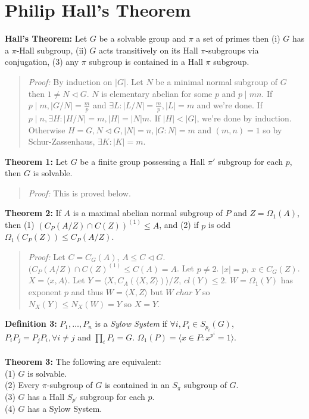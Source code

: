 \section {Philip Hall's Theorem} 
{\bf Hall's Theorem:} 
Let $G$ be a solvable group and $\pi$ a set of primes then (i) $G$ has a $\pi$-Hall
subgroup, (ii) $G$ acts transitively on its Hall $\pi$-subgroups via conjugation, 
(3) any $\pi$ subgroup is contained in a Hall $\pi$ subgroup.
\begin{quote}
\emph{Proof:} By induction on $|G|$.  Let $N$ be a minimal normal subgroup of $G$ then
$1 \ne N \lhd G$.  $N$ is elementary abelian for some $p$ and $p \mid mn$.   If
$p \mid m, |G/N|= {\frac m p}$ and $\exists L: |L/N|= {\frac m p}, |L|= m$ and we're done.
If $p \mid n, \exists H: |H/N|=m, |H|= |N|m$.  If $|H| < |G|$, we're done by induction.
Otherwise $H=G, N \lhd G, |N|= n, |G:N|=m$ and $(m,n)=1$ so by Schur-Zassenhaus,
$\exists K: |K|=m$.
\end{quote}
{\bf Theorem 1: } Let $G$ be a finite group possessing a Hall $\pi'$ subgroup for each $p$, then $G$ 
is solvable. 
\begin{quote}
\emph{Proof:}  
This is proved below.
\end{quote}
{\bf Theorem 2:}
If $A$ is a maximal abelian normal subgroup of $P$ and $Z=\Omega_1(A)$, then
(1) $(C_P(A/Z) \cap C(Z))^{(1)} \le A$, and (2) if $p$ is odd $\Omega_1(C_P(Z)) \le C_P(A/Z)$.
\begin{quote}
\emph{Proof:}  
Let $C= C_G(A)$, $A \le C \lhd G$.  $(C_P(A/Z) \cap C(Z)^{(1)} \le C(A)=A$.  Let 
$p \ne 2$.  $|x|=p$, $x \in C_G(Z)$.  $X= \langle x, A \rangle $.  Let 
$Y= \langle X, C_A( \langle X,Z \rangle) \rangle /Z$,
$cl(Y) \le 2$.  $W= \Omega_1(Y)$ has exponent $p$ and thus $W= \langle X, Z \rangle $ but
$W \; char \; Y$ so $N_X(Y) \le N_X(W)= Y$ so $X=Y$.
\end{quote}
{\bf Definition 3:} 
$P_1, \ldots , P_n$ is a \emph{Sylow System} if $\forall i, P_i \in S_{p_i}(G)$,
$P_i P_j = P_j P_i, \forall i \ne j$ and $\prod_i P_i = G$.  
$\Omega_1(P)= \langle x \in P: x^{p^i}=1 \rangle $.
\\
\\
{\bf Theorem 3:}
The following are equivalent:\\
(1) $G$ is solvable.\\
(2) Every $\pi$-subgroup of $G$ is contained in an $S_{\pi}$ subgroup of $G$.\\
(3) $G$ has a Hall $S_{p'}$ subgroup for each $p$.\\
(4) $G$ has a Sylow System.
